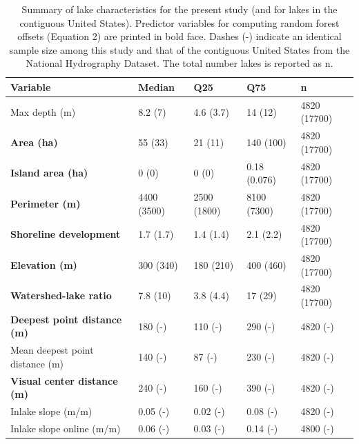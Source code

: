 \documentclass[draft,wrr]{agutexSI2019}
\begin{document}
\begin{table}
      \caption{Summary of lake characteristics for the present study (and for lakes in the contiguous United States). Predictor variables for computing random forest offsets (Equation 2) are printed in bold face. Dashes (-) indicate an identical sample size among this study and that of the contiguous United States from the National Hydrography Dataset. The total number lakes is reported as n.} \label{tableS1}
      \centering
      \setlength\tabcolsep{1.5pt} %
      \begin{tabular}{lllll}
            \hline
            Variable                            & Median      & Q25         & Q75          & n            \\
            \hline
            Max depth (m)                       & 8.2 (7)     & 4.6 (3.7)   & 14 (12)      & 4820 (17700) \\
            \textbf{Area (ha)}                  & 55 (33)     & 21 (11)     & 140 (100)    & 4820 (17700) \\
            \textbf{Island area (ha)}           & 0 (0)       & 0 (0)       & 0.18 (0.076) & 4820 (17700) \\
            \textbf{Perimeter (m)}              & 4400 (3500) & 2500 (1800) & 8100 (7300)  & 4820 (17700) \\
            \textbf{Shoreline development}      & 1.7 (1.7)   & 1.4 (1.4)   & 2.1 (2.2)    & 4820 (17700) \\
            \textbf{Elevation (m)}              & 300 (340)   & 180 (210)   & 400 (460)    & 4820 (17700) \\
            \textbf{Watershed-lake ratio}       & 7.8 (10)    & 3.8 (4.4)   & 17 (29)      & 4820 (17700) \\
            \textbf{Deepest point distance (m)} & 180 (-)     & 110 (-)     & 290 (-)      & 4820 (-)     \\
            Mean deepest point distance (m)     & 140 (-)     & 87 (-)      & 230 (-)      & 4820 (-)     \\
            \textbf{Visual center distance (m)} & 240 (-)     & 160 (-)     & 390 (-)      & 4820 (-)     \\
            Inlake slope (m/m)                  & 0.05 (-)    & 0.02 (-)    & 0.08 (-)     & 4820 (-)     \\
            Inlake slope online (m/m)           & 0.06 (-)    & 0.03 (-)    & 0.14 (-)     & 4800 (-)     \\

\end{tabular}
\end{table}
\end{document}
